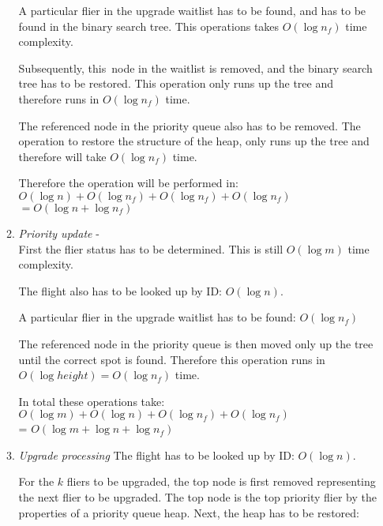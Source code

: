 \documentclass{article}
\begin{document}
\begin{enumerate}[label=(\alph*)]
\begin{enumerate}[label=(\arabic*)]
            A particular flier in the upgrade waitlist has to be found,
            and has to be found in the binary search tree.
            This operations takes $O(\log n_f)$ time complexity.

            Subsequently, this node in the waitlist is removed,
            and the binary search tree has to be restored.
            This operation only runs up the tree and therefore runs in
            $O(\log n_f)$ time.

            The referenced node in the priority queue also has to be removed.
            The operation to restore the structure of the heap, only runs
            up the tree and therefore will take $O(\log n_f)$ time.
            
            Therefore the operation will be performed in: \\
            $O(\log n) + O(\log n_f) + O(\log n_f) + O(\log n_f)$ \\
            $=O(\log n + \log n_f)$

        \item \emph{Priority update} -  \\
            First the flier status has to be determined.
            This is still $O(\log m)$ time complexity.
            
            The flight also has to be looked up by ID: $O(\log n)$.

            A particular flier in the upgrade waitlist has to be found:
            $O(\log n_f)$

            The referenced node in the priority queue is then moved
            only up the tree until the correct spot is found.
            Therefore this operation runs in
            $O(\log height) = O(\log n_f)$ time.

            In total these operations take: \\
            $O(\log m) + O(\log n) + O(\log n_f) + O(\log n_f)$ \\
            = $O(\log m + \log n + \log n_f)$

        \item \emph{Upgrade processing}
            The flight has to be looked up by ID: $O(\log n)$.

            For the $k$ fliers to be upgraded,
            the top node is first removed representing the next
            flier to be upgraded. The top node is the top priority
            flier by the properties of a priority queue heap.
            Next, the heap has to be restored:


\end{enumerate}
\end{enumerate}
\end{document}
